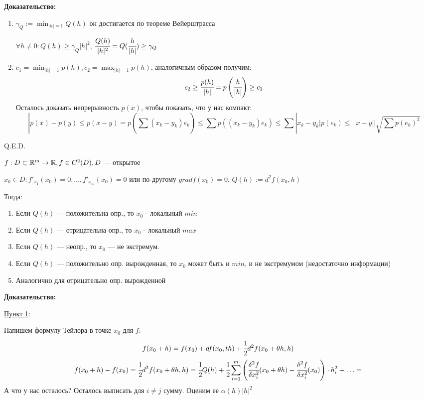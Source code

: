 \textbf{Доказательство:}

\begin{enumerate}
    \item $\gamma_Q := \min_{|h|=1} Q(h)$ он достигается по теореме Вейерштрасса

    $\forall h \neq 0 : Q(h) \geq \gamma_Q|h|^2$, $\cfrac{Q(h)}{|h|^2}=Q(\cfrac{h}{|h|}) \geq \gamma_Q$
    \item $c_1 = \min_{|h| = 1}p(h), c_2 = \max_{|h|=1}p(h)$, аналогичным образом получим:
    $$c_2\geq\cfrac{p(h)}{|h|} = p\left(\cfrac{h}{|h|}\right)\geq c_1$$
    Осталось доказать непрерывность $p(x)$, чтобы показать, что у нас компакт:
    $$|p(x)-p(y) \leq p(x-y) = p(\sum\limits_{}(x_k-y_k)e_k) \leq \sum\limits_{}p((x_k-y_k)e_k)\leq \sum\limits_{}|x_k-y_k|p(e_k) \leq ||x-y||\sqrt{ \sum\limits_{}p(e_k)^2}$$
\end{enumerate}
\hfill Q.E.D.


$f: D \subset \mathbb{R}^m \rightarrow \mathbb{R},  f \in C^2(D),  D$ --- открытое

$x_0 \in D: f'_{x_1} (x_0) = 0, \ldots, f'_{x_m} (x_0) = 0$ или по-другому $grad f(x_0) = 0$, $Q(h) := d^2 f(x_0, h)$

Тогда:
\begin{enumerate}
    \item  Если $Q(h)$ --- положительна опр., то $x_0$ - локальный $min$
\item Если $Q(h)$ --- отрицательна опр., то $x_0$ - локальный $max$
\item Если $Q(h)$ --- неопр., то $x_0$ --- не экстремум.
\item  Если $Q(h)$ --- положительно опр. вырожденная, то $x_0$ может быть и $min$, и не экстремумом (недостаточно информации)
\item Аналогично для отрицательно опр. вырожденной
\end{enumerate}

\textbf{Доказательство:}

\uline{Пункт 1}:

Напишем формулу Тейлора в точке $x_0$ для $f$:
$$f(x_0+h) = f(x_0) + df(x_0,th) +  \cfrac{1}{2}d^2f(x_0 + \theta h,h)$$
$$f(x_0+h) - f(x_0) = \cfrac{1}{2}d^2f(x_0 + \theta h,h) = \cfrac{1}{2}Q(h) + \cfrac{1}{2}\sum\limits_{i=1}^m\left (\cfrac{\delta^2f }{\delta    x_i^2}(x_0 + \theta h) - \cfrac{\delta^2 f}{\delta x_i^2}(x_0)\right)\cdot h_i^2  + \ldots = $$
А что у нас осталось? Осталось выписать для $i\neq j$ сумму. Оценим ее $\alpha(h)|h|^2$

